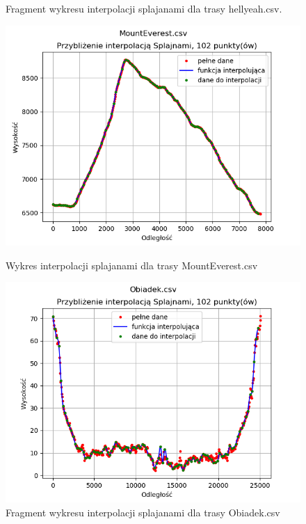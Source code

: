 \documentclass{article} %
\begin{document}
\begin{figure}[h!]
\begin{minipage}[b]{0.4\textwidth}
        \caption{Fragment wykresu interpolacji splajanami dla trasy hellyeah.csv.}
    \end{minipage}
    \begin{minipage}[b]{0.4\textwidth}
        \includegraphics[width=\textwidth]{splajny/rozne_trasy/me_102.png}
        \caption{Wykres interpolacji splajanami dla trasy MountEverest.csv}
    \end{minipage}
    \hfill
    \begin{minipage}[b]{0.4\textwidth}
        \includegraphics[width=\textwidth]{splajny/rozne_trasy/ob_102.png}
        \caption{Fragment wykresu interpolacji splajanami dla trasy Obiadek.csv}
    \end{minipage}
    \begin{minipage}[b]{0.4\textwidth}

\end{minipage}
\end{figure}
\end{document}
